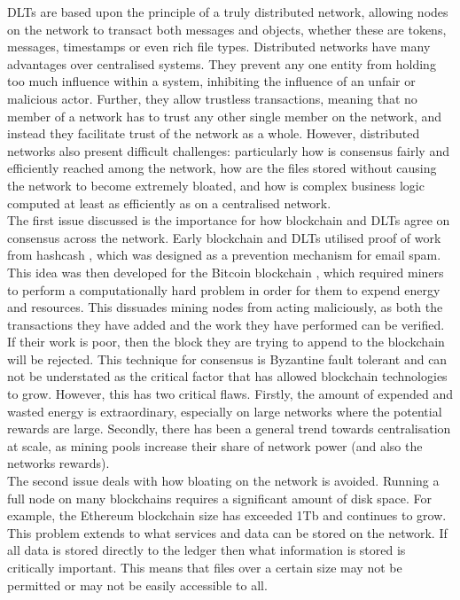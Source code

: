 DLTs are based upon the principle of a truly distributed network, allowing nodes on the network to transact both messages and objects, whether these are tokens, messages, timestamps or even rich file types. Distributed networks have many advantages over centralised systems. They prevent any one entity from holding too much influence within a system, inhibiting the influence of an unfair or malicious actor. Further, they allow trustless transactions, meaning that no member of a network has to trust any other single member on the network, and instead they facilitate trust of the network as a whole. However, distributed networks also present difficult challenges: particularly how is consensus fairly and efficiently reached among the network, how are the files stored without causing the network to become extremely bloated, and how is complex business logic computed at least as efficiently as on a centralised network. \\

The first issue discussed is the importance for how blockchain and DLTs agree on consensus across the network. Early blockchain and DLTs utilised proof of work from hashcash \cite{back2002hashcash}, which was designed as a prevention mechanism for email spam. This idea was then developed for the Bitcoin blockchain \cite{nakamoto2008bitcoin}, which required miners to perform a computationally hard problem in order for them to expend energy and  resources. This dissuades mining nodes from acting maliciously, as both the transactions they have added and the work they have performed can be verified. If their work is poor, then the block they are trying to append to the blockchain will be rejected. This technique for consensus is Byzantine fault tolerant and can not be understated as the critical factor that has allowed blockchain technologies to grow. However, this has two critical flaws. Firstly, the amount of expended and wasted energy is extraordinary, especially on large networks where the potential rewards are large. Secondly, there has been a general trend towards centralisation at scale, as mining pools increase their share of network power (and also the networks rewards). \\

The second issue deals with how bloating on the network is avoided. Running a full node on many blockchains requires a significant amount of disk space. For example, the Ethereum blockchain size has exceeded 1Tb \cite{EthBloat} and continues to grow. This problem extends to what services and data can be stored on the network. If all data is stored directly to the ledger then what information is stored is critically important. This means that files over a certain size may not be permitted or may not be easily accessible to all. \\

